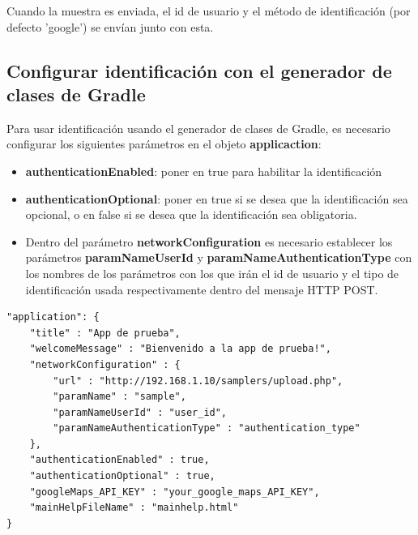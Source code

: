 Cuando la muestra es enviada, el id de usuario y el método de identificación (por defecto 'google') se envían junto con esta.


\subsection{Configurar identificación con el generador de clases de Gradle} \label{sec:identificacion_gradle}

Para usar identificación usando el generador de clases de Gradle, es necesario configurar los siguientes parámetros en el objeto \textbf{applicaction}:

\begin{itemize}

	\item \textbf{authenticationEnabled}: poner en true para habilitar la identificación
		
	\item \textbf{authenticationOptional}: poner en true si se desea que la identificación sea opcional, o en false si se desea que la identificación sea obligatoria.
	
	\item Dentro del parámetro \textbf{networkConfiguration} es necesario establecer los parámetros \textbf{paramNameUserId} y \textbf{paramNameAuthenticationType} con los nombres de los parámetros con los que irán el id de usuario y el tipo de identificación usada respectivamente dentro del mensaje HTTP POST.
	

\end{itemize}

\clearpage

\begin{lstlisting}[language=XML, frame=tlbr, caption=Ejemplo del objeto application configurado para usar identificación (líneas 7\, 8\, 10 y 11).]
"application": {
	"title" : "App de prueba",
	"welcomeMessage" : "Bienvenido a la app de prueba!",
	"networkConfiguration" : {
		"url" : "http://192.168.1.10/samplers/upload.php",
		"paramName" : "sample",
		"paramNameUserId" : "user_id",
		"paramNameAuthenticationType" : "authentication_type"
	},
	"authenticationEnabled" : true,
	"authenticationOptional" : true,
	"googleMaps_API_KEY" : "your_google_maps_API_KEY",
	"mainHelpFileName" : "mainhelp.html"
}
\end{lstlisting}


